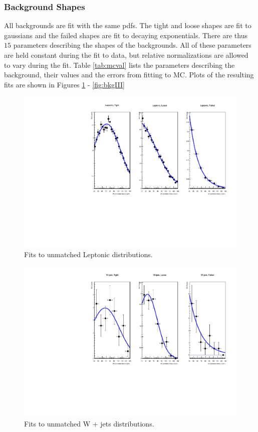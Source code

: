 \subsubsection{Background Shapes}
All backgrounds are fit with the same pdfs. The tight and loose shapes are fit to gaussians and the failed shapes are fit to decaying exponentials. There are thus $15$ parameters describing the shapes of the backgrounds. All of these parameters are held constant during the fit to data, but relative normalizations are allowed to vary during the fit. Table \ref{tab:mcval} lists the parameters describing the background, their values and the errors from fitting to MC. Plots of the resulting fits are shown in Figures \ref{fig:bkgI} - \ref{fig:bkgIII}
\begin{figure}[h!]
\centering
\includegraphics[scale=0.87]{EXO-12-024/figs/WtagSF/Leptonic_fits.pdf}
\caption{Fits to unmatched Leptonic distributions.}\label{fig:bkgI}
\end{figure}
\begin{figure}[h!]
\centering
\includegraphics[scale=0.87]{EXO-12-024/figs/WtagSF/Wjets_fits.pdf}
\caption{Fits to unmatched W + jets distributions.}\label{fig:bkgII}
\end{figure}
